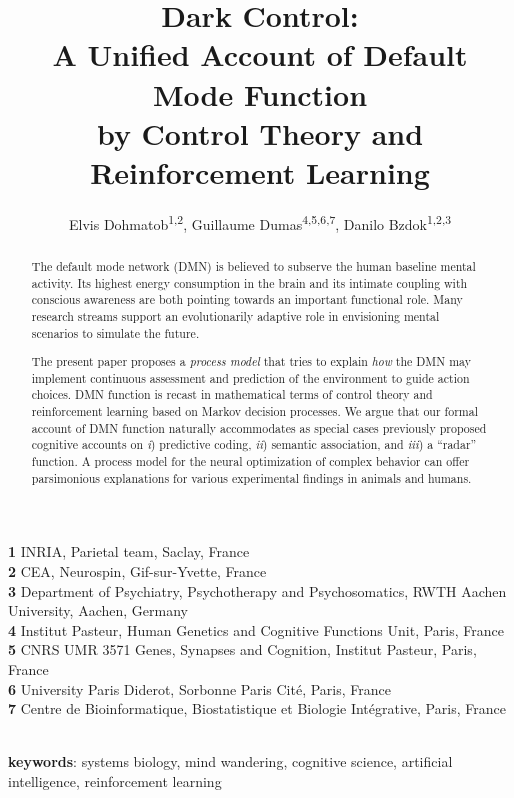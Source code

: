 \documentclass[10pt,letterpaper]{article}
\date{}
\title{Dark Control:\\
       A Unified Account of Default Mode Function\\
       by Control Theory and Reinforcement Learning}
\begin{document}
\author{Elvis Dohmatob\textsuperscript{1,2}, Guillaume Dumas\textsuperscript{4,5,6,7}, Danilo Bzdok\textsuperscript{1,2,3}
}

\maketitle
\small{
    \textbf{1} INRIA, Parietal team, Saclay, France\\
    \textbf{2} CEA, Neurospin, Gif-sur-Yvette, France\\
    \textbf{3} Department of Psychiatry, Psychotherapy and Psychosomatics, RWTH Aachen University, Aachen, Germany\\
    \textbf{4} Institut Pasteur, Human Genetics and Cognitive Functions Unit, Paris, France\\
    \textbf{5} CNRS UMR 3571 Genes, Synapses and Cognition, Institut Pasteur, Paris, France\\
    \textbf{6} University Paris Diderot, Sorbonne Paris Cité, Paris, France\\
    \textbf{7} Centre de Bioinformatique, Biostatistique et Biologie Intégrative, Paris, France
}

\begin{abstract}
The default mode network (DMN) is believed to subserve the human
baseline mental activity.
%
Its highest energy consumption in the brain and
its intimate coupling with conscious awareness are both pointing towards
an important functional role.
%
Many research streams support an evolutionarily adaptive role in
envisioning mental scenarios to simulate the future.


The present paper proposes a \textit{process model}
that tries to explain \textit{how}
the DMN may implement
continuous assessment and prediction of the environment to guide action choices.
%
DMN function is recast in mathematical terms of
control theory and reinforcement learning based on Markov decision processes.
%
We argue that our formal account of DMN function naturally accommodates as special cases
previously proposed cognitive accounts on
\textit{i}) predictive coding,
\textit{ii}) semantic association, and
\textit{iii}) a ``radar'' function.
%
A process model for the neural optimization of complex behavior
can offer parsimonious explanations for
various experimental findings in animals and humans.
\end{abstract}

\textbf{\\keywords}: systems biology, mind wandering, cognitive science,
artificial intelligence,
reinforcement learning
\end{document}
